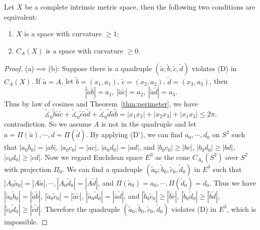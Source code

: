 \begin{prop}\label{prop:cone}
    Let $X$ be a complete intrinsic metric space, then the following two conditions are equivalent:
    \begin{enumerate}[\rm (a)]
        \item $X$ is a space with curvature $\geq 1$;
        \item $C_A(X)$ is a space with curvature $\geq 0$.
    \end{enumerate}
\end{prop}
\begin{proof}
    (a)$\implies$(b):
    Suppose there is a quadruple $(\tilde{a};\tilde{b},\tilde{c},\tilde{d})$ violates (D) in $C_A(X)$.
    If $\tilde{a}=A$, let $\tilde{b}=(x_1,a_1)$, $\tilde{c}=(x_2,a_2)$, $\tilde{d}=(x_3,a_3)$, then
    \[|\tilde{a}\tilde{b}|=a_1,\ |\tilde{a}\tilde{c}|=a_2,\ |\tilde{a}\tilde{d}|=a_3.\]
    Thus by law of cosines and Theorem~\ref{thm:perimeter}, we have
    \[\tilde{\measuredangle}_0{\tilde{b}\tilde{a}\tilde{c}}+\tilde{\measuredangle}_0{\tilde{c}\tilde{a}\tilde{d}}+\tilde{\measuredangle}_0{\tilde{d}\tilde{a}\tilde{b}}=|x_1x_2|+|x_2x_3|+|x_1x_3|\leq 2\pi,\]
    contradiction.
    So we assume $A$ is not in the quadruple and let $a=\Pi(\tilde{a}),\cdots,d=\Pi(\tilde{d})$.
    By applying (D'), we can find $a_0,\cdots,d_0$ on $S^2$ such that $|a_0b_0|=|ab|$, $|a_0c_0|=|ac|$, $|a_0d_0|=|ad|$, and $|b_0c_0|\geq|bc|$, $|b_0d_0|\geq|bd|$, $|c_0d_0|\geq|cd|$.
    Now we regard Euclidean space $E^3$ as the cone $C_{A_0}(S^2)$ over $S^2$ with projection $\Pi_0$.
    We can find a quadruple $(\tilde{a}_0;\tilde{b}_0,\tilde{c}_0,\tilde{d}_0)$ in $E^3$ such that $|A_0\tilde{a}_0|=|A\tilde{a}|,\cdots,|A_0\tilde{d}_0|=|A\tilde{d}|$, and $\Pi(\tilde{a}_0)=a_0,\cdots,\Pi(\tilde{d}_0)=d_0$.
    Thus we have $|\tilde{a}_0\tilde{b}_0|=|\tilde{a}\tilde{b}|$, $|\tilde{a}_0\tilde{c}_0|=|\tilde{a}\tilde{c}|$, $|\tilde{a}_0\tilde{d}_0|=|\tilde{a}\tilde{d}|$, and $|\tilde{b}_0\tilde{c}_0|\geq|\tilde{b}\tilde{c}|$, $|\tilde{b}_0\tilde{d}_0|\geq|\tilde{b}\tilde{d}|$, $|\tilde{c}_0\tilde{d}_0|\geq|\tilde{c}\tilde{d}|$.
    Therefore the quadruple $(\tilde{a}_0;\tilde{b}_0,\tilde{c}_0,\tilde{d}_0)$ violates (D) in $E^3$, which is impossible.


\end{proof}
